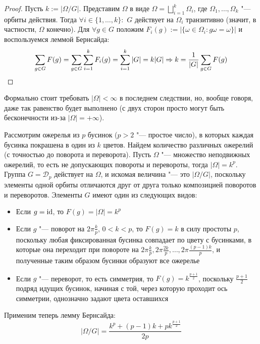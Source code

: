 \begin{proof}
	Пусть $k := |\Omega / G|$. Представим $\Omega$ в виде $\Omega = \bigsqcup_{i = 1}^k\Omega_i$, где $\Omega_1, \dotsc, \Omega_k$ "--- орбиты действия. Тогда $\forall i \in \{1, \dotsc, k\}:$ $G$ действует на $\Omega_i$ транзитивно (значит, в частности, $\Omega$ конечно). Для $\forall g \in G$ положим $F_i(g) := |\{\omega \in \Omega_i: g\omega = \omega\}|$ и воспользуемся леммой Бернсайда:
	\[\sum\limits_{g \in G}F(g) = \sum\limits_{g \in G}\sum\limits_{i = 1}^kF_i(g) = \sum\limits_{i = 1}^k|G| = k|G| \Rightarrow k = \frac1{|G|}\sum\limits_{g \in G}F(g)\]
\end{proof}

\begin{note}
	Формально стоит требовать $|\Omega| < \infty$ в последнем следствии, но, вообще говоря, даже так равенство будет выполнено (с двух сторон просто могут быть бесконечности из-за $|\Omega| = +\infty$).
\end{note}

\begin{example}
	Рассмотрим ожерелья из $p$ бусинок ($p > 2$ "--- простое число), в которых каждая бусинка покрашена в один из $k$ цветов. Найдем количество различных ожерелий (с точностью до поворота и переворота). Пусть $\Omega$ "--- множество неподвижных ожерелий, то есть не допускающих повороты и перевороты, тогда $|\Omega| = k^p$. Группа $G = \mathcal{D}_p$ действует на $\Omega$, и искомая величина "--- это $|\Omega / G|$, поскольку элементы одной орбиты отличаются друг от друга только композицией поворотов и переворотов. Элементы $G$ имеют один из следующих видов:
	\begin{itemize}
		\item Если $g = \operatorname{id}$, то $F(g) = |\Omega| = k^p$
		\item Если $g$ "--- поворот на $2\pi\frac kp$, $0 < k < p$, то $F(g) = k$ в силу простоты $p$, поскольку любая фиксированная бусинка совпадает по цвету с бусинками, в которые она переходит при повороте на $2\pi\frac kp, 2\pi\frac {2k}p, \ldots, 2\pi\frac {(p-1)k}p$, и полученные таким образом бусинки образуют все ожерелье
		\item Если $g$ "--- переворот, то есть симметрия, то $F(g) = k^{\frac{p+1}2}$, поскольку ${\frac{p+1}2}$ подряд идущих бусинок, начиная с той, через которую проходит ось симметрии, однозначно задают цвета оставшихся
	\end{itemize}
	
	Применим теперь лемму Бернсайда:
	\[
		|\Omega / G| = \frac{k^p + (p-1)k + pk^{\frac{p+1}2}}{2p}
	\]
\end{example}

